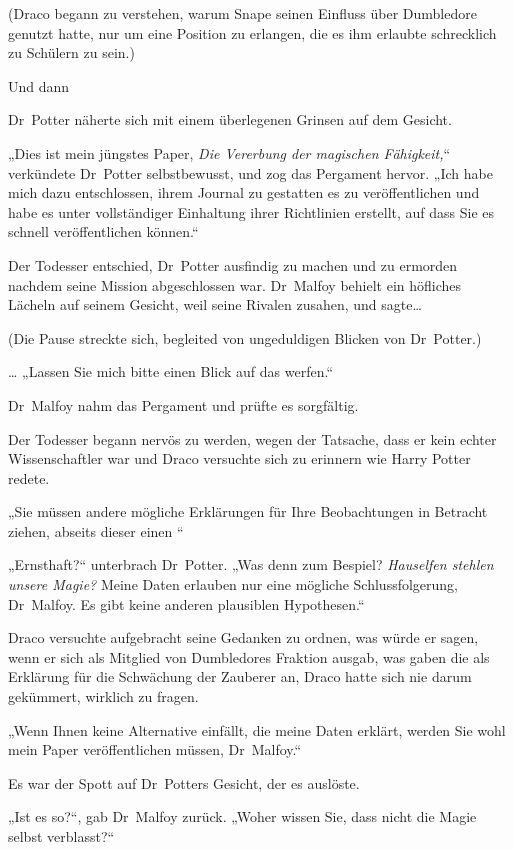 {(Draco begann zu verstehen, warum Snape seinen Einfluss über Dumbledore genutzt hatte, nur um eine Position zu erlangen, die es ihm erlaubte schrecklich zu Schülern zu sein.)

Und dann \later

Dr~Potter näherte sich mit einem überlegenen Grinsen auf dem Gesicht.

„Dies ist mein jüngstes Paper, \emph{Die Vererbung der magischen Fähigkeit,}“ verkündete Dr~Potter selbstbewusst, und zog das Pergament hervor. „Ich habe mich dazu entschlossen, ihrem Journal zu gestatten es zu veröffentlichen und habe es unter vollständiger Einhaltung ihrer Richtlinien erstellt, auf dass Sie es schnell veröffentlichen können.“

Der Todesser entschied, Dr~Potter ausfindig zu machen und zu ermorden nachdem seine Mission abgeschlossen war. Dr~Malfoy behielt ein höfliches Lächeln auf seinem Gesicht, weil seine Rivalen zusahen, und sagte…

(Die Pause streckte sich, begleited von ungeduldigen Blicken von Dr~Potter.)

… „Lassen Sie mich bitte einen Blick auf das werfen.“

Dr~Malfoy nahm das Pergament und prüfte es sorgfältig.

Der Todesser begann nervös zu werden, wegen der Tatsache, dass er kein echter Wissenschaftler war und Draco versuchte sich zu erinnern wie Harry Potter redete.

„Sie müssen andere mögliche Erklärungen für Ihre Beobachtungen in Betracht ziehen, abseits dieser einen \later“

„Ernsthaft?“ unterbrach Dr~Potter. „Was denn zum Bespiel? \emph{Hauselfen stehlen unsere Magie?} Meine Daten erlauben nur eine mögliche Schlussfolgerung, Dr~Malfoy. Es gibt keine anderen plausiblen Hypothesen.“

Draco versuchte aufgebracht seine Gedanken zu ordnen, was würde er sagen, wenn er sich als Mitglied von Dumbledores Fraktion ausgab, was gaben die als Erklärung für die Schwächung der Zauberer an, Draco hatte sich nie darum gekümmert, wirklich zu fragen.

„Wenn Ihnen keine Alternative einfällt, die meine Daten erklärt, werden Sie wohl mein Paper veröffentlichen müssen, Dr~Malfoy.“

Es war der Spott auf Dr~Potters Gesicht, der es auslöste.

„Ist es so?“, gab Dr~Malfoy zurück. „Woher wissen Sie, dass nicht die Magie selbst verblasst?“

}

